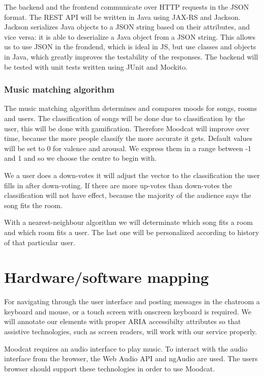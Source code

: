 \par
The backend and the frontend communicate over \Gls{HTTP} requests in the \Gls{JSON} format.
The REST API will be written in Java using JAX-RS and Jackson.
Jackson serializes Java objects to a JSON string based on their attributes, and vice versa: it is able to deserialize a Java object from a JSON string.
This allows us to use JSON in the frondend, which is ideal in \Gls{JS}, but use classes and objects in Java, which greatly improves the testability of the responses.
The backend will be tested with unit tests written using JUnit and Mockito.

\subsubsection{Music matching algorithm}\label{MatchingAlgorithm}
The music matching algorithm determines and compares moods for songs, rooms and users.
The classification of songs will be done due to classification by the user, this will be done with gamification.
Therefore Moodcat will improve over time, because the more people classify the more accurate it gets.
Default values will be set to 0 for valence and arousal. We express them in a range between -1 and 1 and so we choose the centre to begin with.

We a user does a down-votes it will adjust the vector to the classification the user fills in after down-voting.
If there are more up-votes than down-votes the classification will not have effect, because the majority of the audience says the song fits the room.

With a nearest-neighbour algorithm we will determinate which song fits a room and which room fits a user.
The last one will be personalized according to history of that particular user.

\section{Hardware/software mapping}
For navigating through the user interface and posting messages in the chatroom a keyboard and mouse, or a touch screen with onscreen keyboard is required.
We will annotate our elements with proper \Gls{ARIA} accessibilty attributes so that assistive technologies, such as screen readers, will work with our service properly.

\par
Moodcat requires an audio interface to play music.
To interact with the audio interface from the browser, the Web Audio API\cite{WebAudioAPI} and ngAudio\cite{ngAudio} are used.
The users browser should support these technologies in order to use Moodcat.

